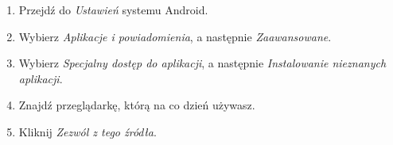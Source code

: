 \begin{enumerate}
	
	\item Przejdź do \textit{Ustawień} systemu Android.
	
	\item Wybierz \textit{Aplikacje i powiadomienia}, a następnie \textit{Zaawansowane}.
	
	\item Wybierz \textit{Specjalny dostęp do aplikacji}, a następnie \textit{Instalowanie nieznanych aplikacji}.
	
	\item Znajdź przeglądarkę, którą na co dzień używasz.
	
	\item Kliknij \textit{Zezwól z tego źródła}.
	\clearpage
	

\end{enumerate}
